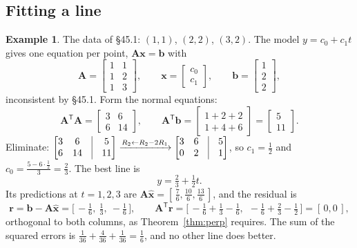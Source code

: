 \documentclass[11pt]{article}
\theoremstyle{plain}
\theoremstyle{definition}
\newtheorem{ex}{Example}[section]
\theoremstyle{remark}
\newcommand{\vc}[1]{\mathbf{#1}}
\newcommand{\mt}[1]{\mathbf{#1}}
\newcommand{\T}{^{\mathsf{T}}}
\newcommand{\xh}{\hat{\vc{x}}}
\begin{document}
\subsection{Fitting a line}
\begin{ex}
\label{ex:fit}
The data of \S45.1: $(1,1)$, $(2,2)$, $(3,2)$. The model $y=c_0+c_1t$ gives one
equation per point, $\mt{A}\vc{x}=\vc{b}$ with
\[
  \mt{A}=\begin{bmatrix}1&1\\1&2\\1&3\end{bmatrix},\qquad
  \vc{x}=\begin{bmatrix}c_0\\c_1\end{bmatrix},\qquad
  \vc{b}=\begin{bmatrix}1\\2\\2\end{bmatrix},
\]
inconsistent by \S45.1. Form the normal equations:
\[
  \mt{A}\T\mt{A}=\begin{bmatrix}3&6\\6&14\end{bmatrix},\qquad
  \mt{A}\T\vc{b}=\begin{bmatrix}1+2+2\\1+4+6\end{bmatrix}=\begin{bmatrix}5\\11\end{bmatrix}.
\]
Eliminate:
$\begin{bmatrix}3&6&\vline&5\\6&14&\vline&11\end{bmatrix}\xrightarrow{R_2\gets R_2-2R_1}
\begin{bmatrix}3&6&\vline&5\\0&2&\vline&1\end{bmatrix}$, so $c_1=\frac12$ and
$c_0=\frac{5-6\cdot\frac12}{3}=\frac23$. The best line is
\[
  y=\tfrac23+\tfrac12t .
\]
Its predictions at $t=1,2,3$ are $\mt{A}\xh=[\,\frac76,\frac{10}{6},\frac{13}{6}\,]$,
and the residual is
\[
  \vc{r}=\vc{b}-\mt{A}\xh=\bigl[\,-\tfrac16,\ \tfrac13,\ -\tfrac16\,\bigr],
  \qquad
  \mt{A}\T\vc{r}=\bigl[\,-\tfrac16+\tfrac13-\tfrac16,\ \ -\tfrac16+\tfrac23-\tfrac12\,\bigr]=[\,0,0\,],
\]
orthogonal to both columns, as Theorem~\ref{thm:perp} requires. The sum of the
squared errors is $\frac1{36}+\frac4{36}+\frac1{36}=\frac16$, and no other line
does better.
\end{ex}
\end{document}
